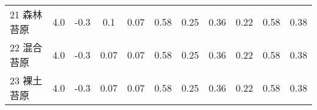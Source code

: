 \begin{sidewaystable}[]
\begin{tabular}{@{}lcccccccccc@{}}
        21 森林苔原    & 4.0        & -0.3                                                                         & 0.1                                                                                                             & 0.07                                                                                                            & 0.58                                                                                                            & 0.25                                                                                                            & 0.36                                                                                                            & 0.22                                                                                                            & 0.58                                                                                                            & 0.38                                                                                                            \\
        22 混合苔原    & 4.0        & -0.3                                                                         & 0.07                                                                                                            & 0.07                                                                                                            & 0.58                                                                                                            & 0.25                                                                                                            & 0.36                                                                                                            & 0.22                                                                                                            & 0.58                                                                                                            & 0.38                                                                                                            \\
        23 裸土苔原    & 4.0        & -0.3                                                                         & 0.07                                                                                                            & 0.07                                                                                                            & 0.58                                                                                                            & 0.25                                                                                                            & 0.36                                                                                                            & 0.22                                                                                                            & 0.58                                                                                                            & 0.38                                                                                                            \\

\end{tabular}
\end{sidewaystable}
